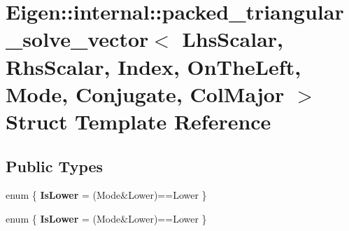\hypertarget{struct_eigen_1_1internal_1_1packed__triangular__solve__vector_3_01_lhs_scalar_00_01_rhs_scalar_04173d9937406f96b80cda304747c263c}{}\section{Eigen\+:\+:internal\+:\+:packed\+\_\+triangular\+\_\+solve\+\_\+vector$<$ Lhs\+Scalar, Rhs\+Scalar, Index, On\+The\+Left, Mode, Conjugate, Col\+Major $>$ Struct Template Reference}
\label{struct_eigen_1_1internal_1_1packed__triangular__solve__vector_3_01_lhs_scalar_00_01_rhs_scalar_04173d9937406f96b80cda304747c263c}
\subsection*{Public Types}
\begin{DoxyCompactItemize}
\item 
\mbox{\label{struct_eigen_1_1internal_1_1packed__triangular__solve__vector_3_01_lhs_scalar_00_01_rhs_scalar_04173d9937406f96b80cda304747c263c_a956da49c953008cb91bd84c255707060}} 
enum \{ {\bfseries Is\+Lower} = (Mode\&Lower)==Lower
 \}
\item 
\mbox{\label{struct_eigen_1_1internal_1_1packed__triangular__solve__vector_3_01_lhs_scalar_00_01_rhs_scalar_04173d9937406f96b80cda304747c263c_ab268b33ca6c30b8daf3888aec02e3d03}} 
enum \{ {\bfseries Is\+Lower} = (Mode\&Lower)==Lower
 \}
\end{DoxyCompactItemize}
